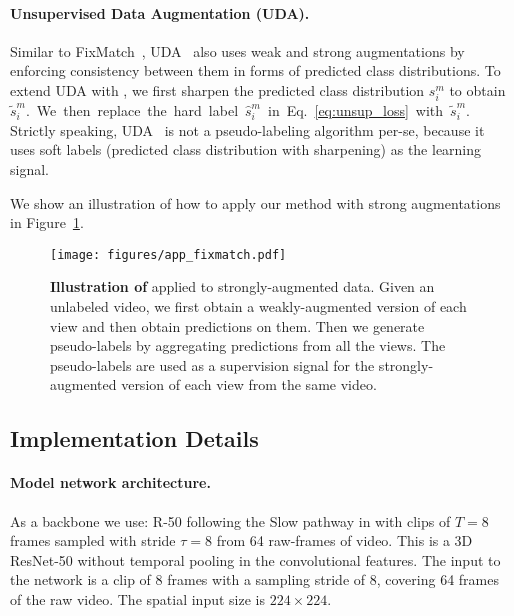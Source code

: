 \documentclass[10pt,twocolumn,letterpaper]{article}
\begin{document}
\paragraph{Unsupervised Data Augmentation (UDA).}
{Similar to FixMatch~\cite{fixmatch}, UDA~\cite{uda} also uses weak and strong augmentations by enforcing consistency between them in forms of predicted class distributions. To extend UDA with \oursshort, we}
first sharpen the predicted class distribution $s_i^m$  to obtain \mbox{$\tilde{s}_i^m$. We then replace the hard label $\hat{s}_i^m$ in Eq.~\ref{eq:unsup_loss} with 
$\tilde{s}_i^m$.}
 Strictly speaking, UDA~\cite{uda} is not a pseudo-labeling algorithm per-se, because it uses soft labels (predicted class distribution with sharpening) as the learning signal. 
 
We show an illustration of how to apply our method with strong augmentations in Figure~\ref{fig:app_fixmatch}.



\begin{figure}[t!]
	\centering
	\renewcommand{\tabcolsep}{0pt}
	\texttt{[image: figures/app\_fixmatch.pdf]}
	\caption{\textbf{Illustration of \oursshort} 
			applied to strongly-augmented data. Given an unlabeled video, we first obtain a weakly-augmented version of each view and then obtain predictions on them. Then we generate pseudo-labels by aggregating predictions from all the views. The pseudo-labels are used as a supervision signal for the 
		strongly-augmented version of each view from the same video.}
	\label{fig:app_fixmatch}
\end{figure}




\subsection{Implementation Details}\label{sec:details}



\paragraph{Model network architecture.} 
 As a backbone we use: R-50 \cite{He16} following the Slow pathway in \cite{feichtenhofer2019slowfast} with clips of $T{=}$8 frames sampled with stride $\tau{=}$8 from 64 raw-frames of video. This is a 3D ResNet-50 \cite{He16} without temporal pooling in the convolutional features. The input to the network is a clip of 8 frames with a sampling stride of 8, covering 64 frames of the raw video. The spatial input size is $224 \times 224$. 
\end{document}
